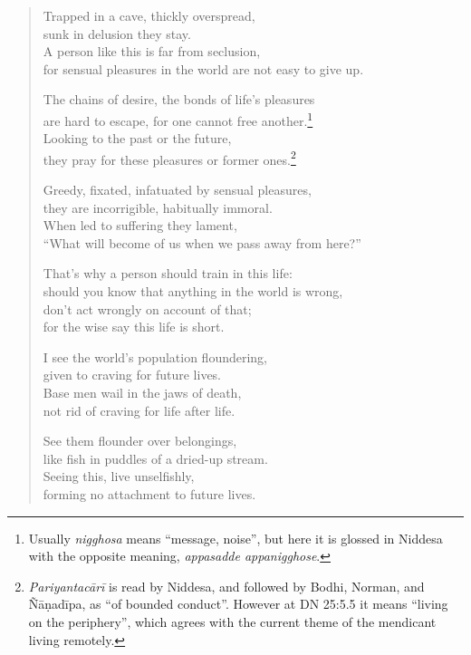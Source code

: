\documentclass[12pt,openany]{book}%
\begin{document}
\begin{verse}%
Trapped in a cave, thickly overspread, \\
sunk in delusion they stay. \\
A person like this is far from seclusion, \\
for sensual pleasures in the world are not easy to give up. 

The chains of desire, the bonds of life’s pleasures \\
are hard to escape, for one cannot free another.\footnote{Usually \textit{nigghosa} means “message, noise”, but here it is glossed in Niddesa with the opposite meaning, \textit{appasadde appanigghose}. } \\
Looking to the past or the future, \\
they pray for these pleasures or former ones.\footnote{\textit{\textsanskrit{Pariyantacārī}} is read by Niddesa, and followed by Bodhi, Norman, and \textsanskrit{Ñāṇadīpa}, as “of bounded conduct”. However at DN 25:5.5 it means “living on the periphery”, which agrees with the current theme of the mendicant living remotely. } 

Greedy, fixated, infatuated by sensual pleasures, \\
they are incorrigible, habitually immoral. \\
When led to suffering they lament, \\
“What will become of us when we pass away from here?” 

That’s why a person should train in this life: \\
should you know that anything in the world is wrong, \\
don’t act wrongly on account of that; \\
for the wise say this life is short. 

I see the world’s population floundering, \\
given to craving for future lives. \\
Base men wail in the jaws of death, \\
not rid of craving for life after life. 

See them flounder over belongings, \\
like fish in puddles of a dried-up stream. \\
Seeing this, live unselfishly, \\
forming no attachment to future lives. 


\end{verse}
\end{document}
